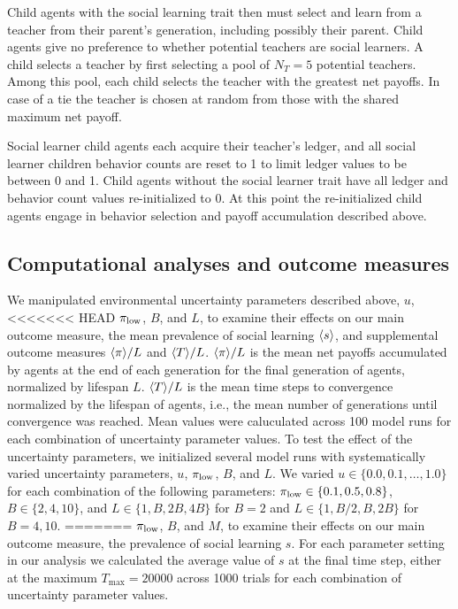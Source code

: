 \documentclass[letterpaper,11.5pt]{scrartcl}
\begin{document}
Child agents with the social learning trait then must select and learn from a
teacher from their parent's generation, including possibly their parent.
Child agents give no preference to whether potential teachers are social 
learners. A child selects a teacher by first selecting a pool of $N_T = 5$ potential
teachers. Among this pool, each child selects the teacher with the greatest
net payoffs. In case of a tie the teacher is chosen at random from those with
the shared maximum net payoff. 

Social learner child agents each acquire their teacher's ledger, and all social
learner children behavior counts are reset to 1 to limit ledger values to be between
0 and 1. Child agents without the social learner trait have all ledger and behavior
count values re-initialized to 0. At this point the re-initialized child agents
engage in behavior selection and payoff accumulation described above. 


\subsection{Computational analyses and outcome measures}

We manipulated environmental uncertainty parameters described above, $u$,
<<<<<<< HEAD
$\pi_{\mathrm{low}}$, $B$, and $L$, to examine their effects on our
main outcome measure, the mean prevalence of social learning $\langle s \rangle$, 
and supplemental outcome measures $\langle \pi \rangle / L$ and $\langle T \rangle / L$. $\langle \pi \rangle / L$ is the
mean net payoffs accumulated by agents at the end of each generation for the
final generation of agents, normalized by lifespan $L$. $\langle T \rangle / L$ is the 
mean time steps to convergence normalized by the lifespan of agents, i.e., the
mean number of generations until convergence was reached. Mean values were
caluculated across 100 model runs for each combination of uncertainty parameter values.
To test the effect of the uncertainty parameters, 
we initialized several model runs with
systematically varied uncertainty parameters, $u$, $\pi_{\mathrm{\mathrm{low}}}$, $B$,
and $L$. We varied $u \in \{0.0, 0.1, \ldots, 1.0\}$ for each combination of
the following parameters:
$\pi_{\mathrm{low}} \in \{0.1, 0.5, 0.8\}$, $B \in \{2, 4, 10\}$, and
$L \in \{1, B, 2B, 4B\}$ for $B=2$ and $L \in \{1, B/2, B, 2B\}$ for $B=4,10$.
=======
$\pi_{\mathrm{low}}$, $B$, and $M$, to examine their effects on our
main outcome measure, the prevalence of social learning $s$. For each parameter setting
in our analysis we calculated the average value of $s$ at the final time step,
either at the maximum $T_{\text{max}}=20000$ across 1000 trials 
for each combination of uncertainty parameter values.
\end{document}
